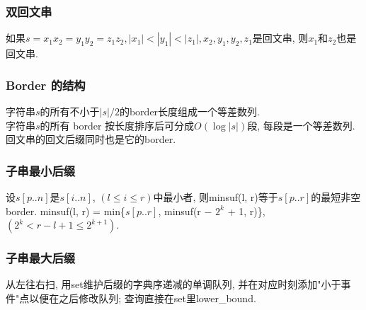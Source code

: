 \subsubsection{双回文串}
\noindent
如果$s=x_1x_2=y_1y_2=z_1z_2, |x_1|<|y_1|<|z_1|, x_2, y_1, y_2, z_1$是回文串, 则$x_1$和$z_2$也是回文串. 

\subsubsection{Border 的结构}
\noindent
字符串$s$的所有不小于$|s|/2$的border长度组成一个等差数列.\\
字符串$s$的所有 border 按长度排序后可分成$O(\log{|s|})$段, 每段是一个等差数列. 回文串的回文后缀同时也是它的border. 

\subsubsection{子串最小后缀}
\noindent
设$s[p..n]$是$s[i..n]$, $(l \leq i \leq r)$中最小者, 则minsuf(l, r)等于$s[p..r]$的最短非空 border. minsuf(l, r) = min\{$s[p..r]$, minsuf(r − $2^k$ + 1, r)\}, $(2^k < r − l + 1 \leq 2^{k+1})$. 

\subsubsection{子串最大后缀}
\noindent
从左往右扫, 用set维护后缀的字典序递减的单调队列, 并在对应时刻添加"小于事件"点以便在之后修改队列; 查询直接在set里lower\_bound.